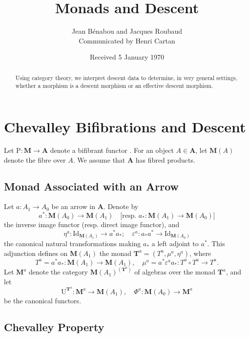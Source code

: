 \documentclass{article}
\begin{document}
\title{Monads and Descent}
\author{Jean B\'enabou and Jacques Roubaud \\ \small Communicated by Henri Cartan}
\date{Received 5 January 1970}

\maketitle

\begin{abstract}
Using category theory, we interpret descent data to determine, in very general settings, whether a morphism is a descent morphism or an effective descent morphism.
\end{abstract}

\section{Chevalley Bifibrations and Descent}

Let $\mathrm{P} : \mathbf{M} \to \mathbf{A}$ denote a bifibrant functor \cite{Grothendieck1959}. For an object $A \in \mathbf{A}$, let $\mathbf{M}(A)$ denote the fibre over $A$. We assume that $\mathbf{A}$ has fibred products.

\subsection{Monad Associated with an Arrow}

Let $a : A_1 \to A_0$ be an arrow in $\mathbf{A}$. Denote by
\[
a^* : \mathbf{M}(A_0) \to \mathbf{M}(A_1) \quad \text{[resp. } a_* : \mathbf{M}(A_1) \to \mathbf{M}(A_0)\text{]}
\]
the inverse image functor (resp. direct image functor), and
\[
\eta^a : \mathrm{Id}_{\mathbf{M}(A_1)} \to a^* a_*; \quad \varepsilon^a : a_* a^* \to \mathrm{Id}_{\mathbf{M}(A_0)}
\]
the canonical natural transformations making $a_*$ a left adjoint to $a^*$. This adjunction defines \cite{Linton1969} on $\mathbf{M}(A_1)$ the monad $\mathbf{T}^a = (T^a, \mu^a, \eta^a)$, where
\[
T^a = a^* a_* : \mathbf{M}(A_1) \to \mathbf{M}(A_1), \quad \mu^a = a^* \varepsilon^a a_* : T^a \circ T^a \to T^a.
\]
Let $\mathbf{M}^a$ denote the category $\mathbf{M}(A_1)^{(\mathbf{T}^a)}$ of algebras over the monad $\mathbf{T}^a$, and let
\[
\mathrm{U}^{\mathbf{T}^a} : \mathbf{M}^a \to \mathbf{M}(A_1), \quad \Phi^a : \mathbf{M}(A_0) \to \mathbf{M}^a
\]
be the canonical functors.

\subsection{Chevalley Property}
\end{document}
